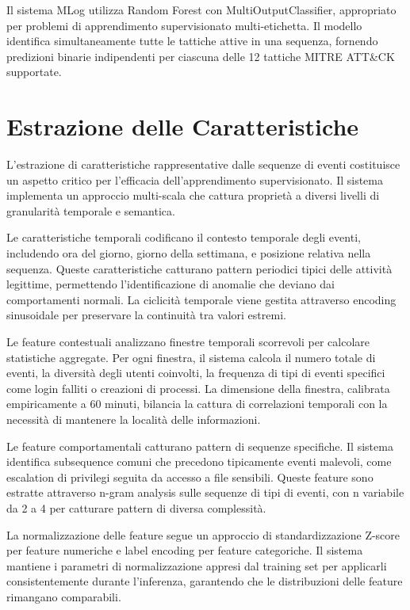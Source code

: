 \documentclass[12pt,a4paper]{report}
\theoremstyle{definition}
\begin{document}
Il sistema MLog utilizza Random Forest con MultiOutputClassifier, appropriato per problemi di apprendimento supervisionato multi-etichetta. Il modello identifica simultaneamente tutte le tattiche attive in una sequenza, fornendo predizioni binarie indipendenti per ciascuna delle 12 tattiche MITRE ATT\&CK supportate.

\section{Estrazione delle Caratteristiche}

L'estrazione di caratteristiche rappresentative dalle sequenze di eventi costituisce un aspetto critico per l'efficacia dell'apprendimento supervisionato. Il sistema implementa un approccio multi-scala che cattura proprietà a diversi livelli di granularità temporale e semantica.

Le caratteristiche temporali codificano il contesto temporale degli eventi, includendo ora del giorno, giorno della settimana, e posizione relativa nella sequenza. Queste caratteristiche catturano pattern periodici tipici delle attività legittime, permettendo l'identificazione di anomalie che deviano dai comportamenti normali. La ciclicità temporale viene gestita attraverso encoding sinusoidale per preservare la continuità tra valori estremi.

Le feature contestuali analizzano finestre temporali scorrevoli per calcolare statistiche aggregate. Per ogni finestra, il sistema calcola il numero totale di eventi, la diversità degli utenti coinvolti, la frequenza di tipi di eventi specifici come login falliti o creazioni di processi. La dimensione della finestra, calibrata empiricamente a 60 minuti, bilancia la cattura di correlazioni temporali con la necessità di mantenere la località delle informazioni.

Le feature comportamentali catturano pattern di sequenze specifiche. Il sistema identifica subsequence comuni che precedono tipicamente eventi malevoli, come escalation di privilegi seguita da accesso a file sensibili. Queste feature sono estratte attraverso n-gram analysis sulle sequenze di tipi di eventi, con n variabile da 2 a 4 per catturare pattern di diversa complessità.

La normalizzazione delle feature segue un approccio di standardizzazione Z-score per feature numeriche e label encoding per feature categoriche. Il sistema mantiene i parametri di normalizzazione appresi dal training set per applicarli consistentemente durante l'inferenza, garantendo che le distribuzioni delle feature rimangano comparabili.
\end{document}
